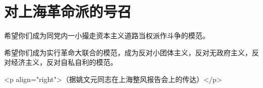 \section[对上海革命派的号召（一九六七年五月）]{对上海革命派的号召}


希望你们成为同党内一小撮走资本主义道路当权派作斗争的模范。

希望你们成为实行革命大联合的模范，成为反对小团体主义，反对无政府主义，反对经济主义，反对自私自利的模范。

<p align="right">（据姚文元同志在上海整风报告会上的传达）</p>


